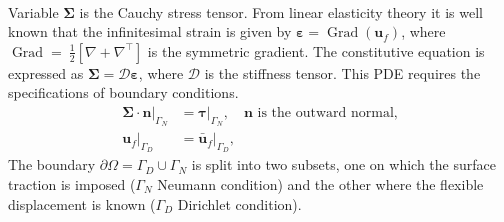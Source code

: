 \documentclass{svjour3}                     %
\DeclareMathOperator*{\Grad}{Grad}
\begin{document}
\begin{itemize}
\begin{equation}
\begin{split}
		\end{split}
	\end{equation}
	Variable $\bm\Sigma$ is the Cauchy stress tensor. From linear elasticity theory it is well known that the infinitesimal strain is given by $\bm\varepsilon = \Grad(\bm{u}_f)$, where $\Grad=~\frac{1}{2}[\nabla+\nabla^\top]$ is the symmetric gradient. The constitutive equation is expressed as $\bm\Sigma =  \bm{\mathcal{D}} \bm\varepsilon$, where $ \bm{\mathcal{D}}$ is the stiffness tensor. This PDE requires the specifications of boundary conditions.
	\begin{equation}
	\label{eq:bcPDE}
	\begin{aligned}
	\bm\Sigma \cdot \bm{n}|_{\Gamma_N} &= \bm\tau|_{\Gamma_N}, \quad \text{$\bm{n}$ is the outward normal,} \\
	\bm{u}_f|_{\Gamma_D} &= \bm{\bar{u}}_f|_{\Gamma_D},
	\end{aligned}
	\end{equation}
	The boundary $\partial \Omega = \Gamma_D \cup \Gamma_N$ is split into two subsets, one on which the surface traction is imposed ($\Gamma_N$ Neumann condition) and the other where the flexible displacement is known ($\Gamma_D$ Dirichlet condition). 
\end{itemize}
\end{document}
